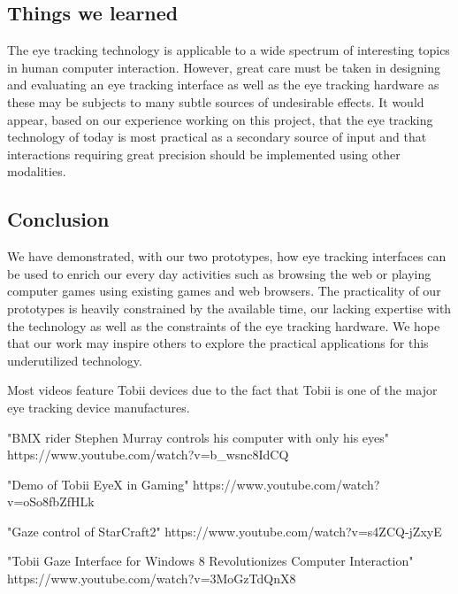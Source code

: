 \documentclass[english]{tktltiki}
\begin{document}
\subsection{Things we learned}

The eye tracking technology is applicable to a wide spectrum of interesting topics in human computer interaction. However, great care must be taken in designing and evaluating an eye tracking interface as well as the eye tracking hardware as these may be subjects to many subtle sources of undesirable effects. It would appear, based on our experience working on this project, that the eye tracking technology of today is most practical as a secondary source of input and that interactions requiring great precision should be implemented using other modalities.


\subsection{Conclusion}

We have demonstrated, with our two prototypes, how eye tracking interfaces can be used to enrich our every day activities such as browsing the web or playing computer games using existing games and web browsers. The practicality of our prototypes is heavily constrained by the available time, our lacking expertise with the technology as well as the constraints of the eye tracking hardware. We hope that our work may inspire others to explore the practical applications for this underutilized technology.
      










\lastpage

\appendices

\pagestyle{empty}


Most videos feature Tobii devices due to the fact that Tobii is one of the major eye tracking device manufactures.

"BMX rider Stephen Murray controls his computer with only his eyes"
https://www.youtube.com/watch?v=b\_wsnc8IdCQ

"Demo of Tobii EyeX in Gaming"
https://www.youtube.com/watch?v=oSo8fbZfHLk

"Gaze control of StarCraft2"
https://www.youtube.com/watch?v=s4ZCQ-jZxyE

"Tobii Gaze Interface for Windows 8 Revolutionizes Computer Interaction"
https://www.youtube.com/watch?v=3MoGzTdQnX8
\end{document}
